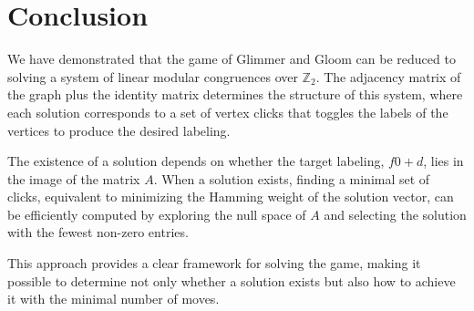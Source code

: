 \documentclass{article}
\begin{document}
\section{Conclusion}

We have demonstrated that the game of Glimmer and Gloom can be reduced to solving a system of linear modular congruences over \( \mathbb{Z}_2 \). The adjacency matrix of the graph plus the identity matrix determines the structure of this system, where each solution corresponds to a set of vertex clicks that toggles the labels of the vertices to produce the desired labeling.

The existence of a solution depends on whether the target labeling, \( f0+d \), lies in the image of the matrix \( A \). When a solution exists, finding a minimal set of clicks, equivalent to minimizing the Hamming weight of the solution vector, can be efficiently computed by exploring the null space of \( A \) and selecting the solution with the fewest non-zero entries.

This approach provides a clear framework for solving the game, making it possible to determine not only whether a solution exists but also how to achieve it with the minimal number of moves.
\end{document}
